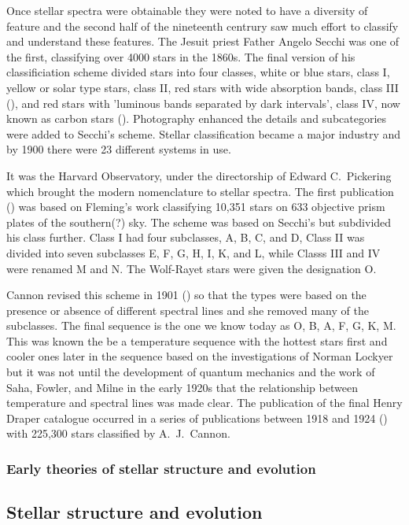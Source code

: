 Once stellar spectra were obtainable  they were
noted to have a diversity of feature and the second half of the
nineteenth centrury saw much effort to classify and understand these
features.  The Jesuit priest Father Angelo Secchi was one of the
first, classifying over 4000 stars in the 1860s.  The final version of
his classificiation scheme  divided stars into four
classes, white or blue stars, class I, yellow or solar type stars,
class II, red stars with wide absorption bands, class III
(\cite{Secchi1863}), and red stars with 'luminous bands separated by
dark intervals', class IV, now known as carbon stars
(\cite{Secchi1868}). Photography enhanced the details and subcategories
were added to Secchi's scheme.  Stellar classification became a major
industry and by 1900 there were 23 different systems in use.

It was the Harvard Observatory, under the directorship of Edward C.\
Pickering which brought the modern nomenclature to stellar spectra.
The first publication (\cite{Pickering1890}) was based on Fleming's
work classifying 10,351 stars on 633 objective prism plates of the
southern(?) sky. The scheme was based on Secchi's but subdivided his
class further. Class I had four subclasses, A, B, C, and D, Class II
was divided into seven subclasses E, F, G, H, I, K, and L, while
Classs III and IV were renamed M and N.  The Wolf-Rayet stars were
given the designation O.

Cannon  revised this scheme in 1901
(\cite{Cannon1901}) so that the types were based on the presence or
absence of different spectral lines and she removed many of the
subclasses.  The final sequence is the one we know today as O, B, A,
F, G, K, M. This was known the be a temperature sequence with the
hottest stars first and cooler ones later in the sequence based on the
investigations of Norman Lockyer but it was not until the development
of quantum mechanics and the work of Saha, Fowler, and Milne in the
early 1920s that the relationship between temperature and spectral
lines was made clear. The publication \marginpar{p. 1694} of the final
Henry Draper catalogue occurred in a series of publications between
1918 and 1924 (\cite{Pickering1918}) with 225,300 stars classified by
A.\ J.\ Cannon.

\subsubsection{Early theories of stellar structure and evolution}



\subsection{Stellar structure and evolution}

